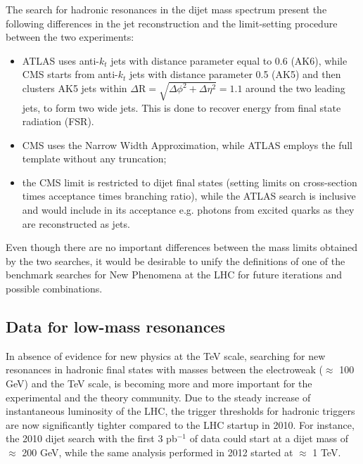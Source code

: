 \documentclass{PoS}
\newcommand{\antikt}{anti-$k_t$}
\begin{document}
The search for hadronic resonances in the dijet mass spectrum present 
the following differences in the jet reconstruction and the limit-setting procedure between the two experiments:
\begin{itemize}
\item ATLAS uses \antikt{} jets with distance parameter equal to 0.6 (AK6), while 
CMS starts from  \antikt{} jets with distance parameter 0.5
(AK5) and then clusters AK5 jets within $\Delta\mbox{R}=\sqrt{\Delta\phi^2+\Delta\eta^2}=1.1$ around the two leading jets, to form two wide jets. This is done to recover energy from final 
state radiation (FSR).
 \item CMS uses the Narrow Width Approximation, while ATLAS employs the full template without any truncation;
 \item the CMS limit is restricted to dijet final states (setting limits on cross-section times acceptance times branching ratio), while the ATLAS search is inclusive and would include in its acceptance e.g. photons from excited quarks as they are reconstructed as jets. 
\end{itemize}
Even though there are no important differences between the mass limits obtained by the two searches, 
it would be desirable to unify the definitions of one of the benchmark searches for New Phenomena at the LHC
for future iterations and possible combinations. 

\subsection{Data for low-mass resonances}
In absence of evidence for new physics at the TeV scale, 
searching for new resonances in hadronic final states with masses 
between the electroweak ($\approx$ 100 GeV) and the TeV scale, 
is becoming more and more important for the experimental and the theory community.
Due to the steady increase of instantaneous luminosity of the LHC, 
the trigger thresholds for hadronic triggers are now significantly 
tighter compared to the LHC startup in 2010. For instance, the 2010 
dijet search with the first  3 pb$^{-1}$ of data could start at a dijet mass 
of $\approx$ 200 GeV, while the same analysis performed in 2012 
started at $\approx$ 1 TeV.
\end{document}

